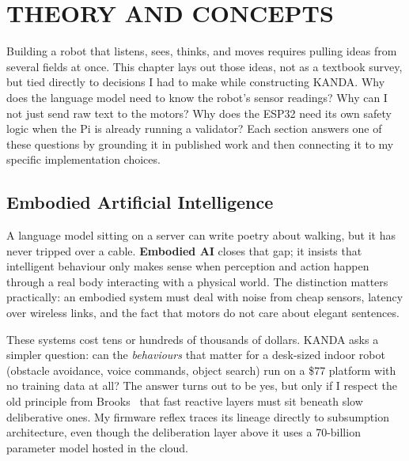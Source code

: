 \chapter{THEORY AND CONCEPTS}
\label{ch:theory}

Building a robot that listens, sees, thinks, and moves requires pulling ideas from several fields at once. This chapter lays out those ideas, not as a textbook survey, but tied directly to decisions I had to make while constructing KANDA. Why does the language model need to know the robot's sensor readings? Why can I not just send raw text to the motors? Why does the ESP32 need its own safety logic when the Pi is already running a validator? Each section answers one of these questions by grounding it in published work and then connecting it to my specific implementation choices.


\section{Embodied Artificial Intelligence}
\label{sec:embodied}

A language model sitting on a server can write poetry about walking, but it has never tripped over a cable. \textbf{Embodied AI} closes that gap; it insists that intelligent behaviour only makes sense when perception and action happen through a real body interacting with a physical world. The distinction matters practically: an embodied system must deal with noise from cheap sensors, latency over wireless links, and the fact that motors do not care about elegant sentences.


These systems cost tens or hundreds of thousands of dollars. KANDA asks a simpler question: can the \textit{behaviours} that matter for a desk-sized indoor robot (obstacle avoidance, voice commands, object search) run on a \$77 platform with no training data at all? The answer turns out to be yes, but only if I respect the old principle from Brooks~\cite{brooks1986robust} that fast reactive layers must sit beneath slow deliberative ones. My firmware reflex traces its lineage directly to subsumption architecture, even though the deliberation layer above it uses a 70-billion parameter model hosted in the cloud.


